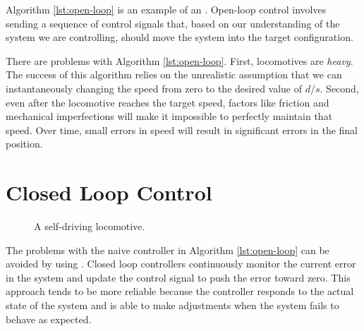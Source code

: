 Algorithm \ref{lst:open-loop} is an example of an . Open-loop control involves
sending a sequence of control signals that, based on our understanding
of the system we are controlling, should move the system into the
target configuration.

There are problems with Algorithm \ref{lst:open-loop}.  First,
locomotives are \emph{heavy}.  The success of this algorithm relies on
the unrealistic assumption that we can instantaneously changing the
speed from zero to the desired value of $d/s$.  Second, even after the
locomotive reaches the target speed, factors like friction and
mechanical imperfections will make it impossible to perfectly maintain
that speed. Over time, small errors in speed will result in
significant errors in the final position.


\section{Closed Loop Control}

\begin{figure}
\begin{center}
\end{center}
\caption{A self-driving locomotive.}
\label{fig:locomotive2}
\end{figure}


The problems with the naive controller in Algorithm
\ref{lst:open-loop} can be avoided by using .  Closed loop controllers
continuously monitor the current error in the system and update the
control signal to push the error toward zero.  This approach tends to
be more reliable because the controller responds to the actual state
of the system and is able to make adjustments when the system fails to
behave as expected.


